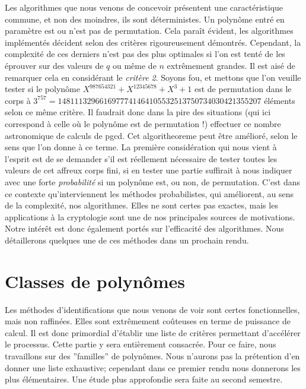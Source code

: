 \documentclass[12pt]{article}
\theoremstyle{remark}\newtheorem{note}{Note}
\theoremstyle{remark}\newtheorem{nota}{Notation}
\theoremstyle{definition}
\begin{document}
Les algorithmes que nous venons de concevoir présentent une caractéristique commune, et non des moindres, ils sont déterministes. Un polynôme entré en paramètre est ou n'est pas de permutation. Cela paraît évident, les algorithmes implémentés décident selon des critères rigoureusement démontrés. Cependant, la complexité de ces derniers n'est pas des plus optimales si l'on est tenté de les éprouver sur des valeurs de $q$ ou même de $n$ extrêmement grandes. Il est aisé de remarquer cela en considérant le \textit{critère 2}. Soyons fou, et mettons que l'on veuille tester si le polynôme $X^{987654321} + X^{12345678} + X^3 + 1$ est de permutation dans le corps à $3^{757} = 1481113296616977741464105532513750734030421355207$ éléments selon ce même critère. Il faudrait donc dans la pire des situations (qui ici correspond à celle où le polynôme est de permutation !) effectuer ce nombre astronomique de calculs de pgcd. Cet algoritheoreme peut être amélioré, selon le sens que l'on donne à ce terme. La première considération qui nous vient à l'esprit est de se demander s'il est réellement nécessaire de tester toutes les valeurs de cet affreux corps fini, si en tester une partie suffirait à nous indiquer avec une forte \textit{probabilité} si un polynôme est, ou non, de permutation. C'est dans ce contexte qu'interviennent les méthodes probabilistes, qui améliorent, au sens de la complexité, nos algorithmes. Elles ne sont certes pas exactes, mais les applications à la cryptologie sont une de nos principales sources de motivations. Notre intérêt est donc également portés sur l'efficacité des algorithmes.
Nous détaillerons quelques une de ces méthodes dans un prochain rendu.

\pagebreak

\section{Classes de polynômes}
Les méthodes d'identifications que nous venons de voir sont certes fonctionnelles, mais non raffinées. Elles sont extrêmement coûteuses en terme de puissance de calcul. Il est donc primordial d'établir une liste de critères permettant d'accélérer le processus. Cette partie y sera entièrement consacrée. Pour ce faire, nous travaillons sur des ''familles'' de polynômes. Nous n'aurons pas la prétention d'en donner une liste exhaustive; cependant dans ce premier rendu nous donnerons les plus élémentaires. Une étude plus approfondie sera faite au second semestre.
\end{document}
